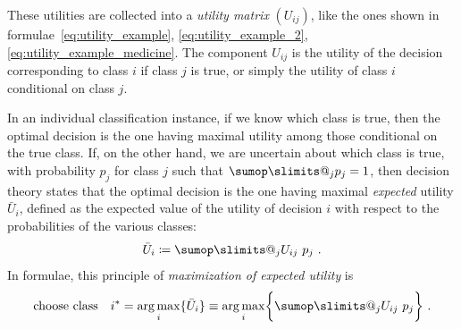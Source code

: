 \documentclass[\ifafour a4paper,12pt,\else a5paper,10pt,\fi%
onecolumn,oneside,article,%
british%
]{memoir}
\makeatletter
\theoremstyle{remark}
\theoremstyle{innote}
\def\sum{\DOTSI\sumop\slimits@}
\newcommand*{\mathte}[1]{\textbf{\textit{\textsf{#1}}}}
\newcommand*{\defd}{\coloneqq}
\DeclarePairedDelimiter\set{\{}{\}} %
\newcommand*{\p}{\mathrm{p}}%
\renewcommand*{\|}[1][]{\nonscript\:#1\vert\nonscript\:\mathopen{}}
\DeclareMathOperator*{\argmax}{arg\,max}
\newcommand*{\eu}{\bar{U}}
\makeatother
\begin{document}
These utilities are collected into a \emph{utility matrix} $(U_{ij})$, like the ones shown in formulae~\eqref{eq:utility_example}, \eqref{eq:utility_example_2}, \eqref{eq:utility_example_medicine}.
The component $U_{ij}$ is the utility of the decision corresponding to class $i$ if class $j$ is true, or simply the utility of class $i$ conditional on class $j$.

In an individual classification instance, if we know which class is true, then the optimal decision is the one having maximal utility among those conditional on the true class. If, on the other hand, we are uncertain about which class is true, with probability $p_{j}$ for class $j$ such that $\sum_{j}p_{j}=1$, then decision theory states that the optimal decision is the one having maximal \emph{expected} utility $\eu_{i}$, defined as the expected value of the utility of decision $i$ with respect to the probabilities of the various classes:
\begin{equation}
  \label{eq:exp_utility}
  \eu_{i} \defd \sum_{j} U_{ij}\ p_{j} \ .
\end{equation}
In formulae, this principle of \emph{maximization of expected utility}  is
\begin{equation}
  \label{eq:max_expe_utility}
  \text{choose class}\quad
  i^{*} = \argmax_{i}\set{\eu_{i}} \equiv \argmax_{i}\set[\bigg]{\sum_{j} U_{ij}\ p_{j}} \ .
\end{equation}
\end{document}
